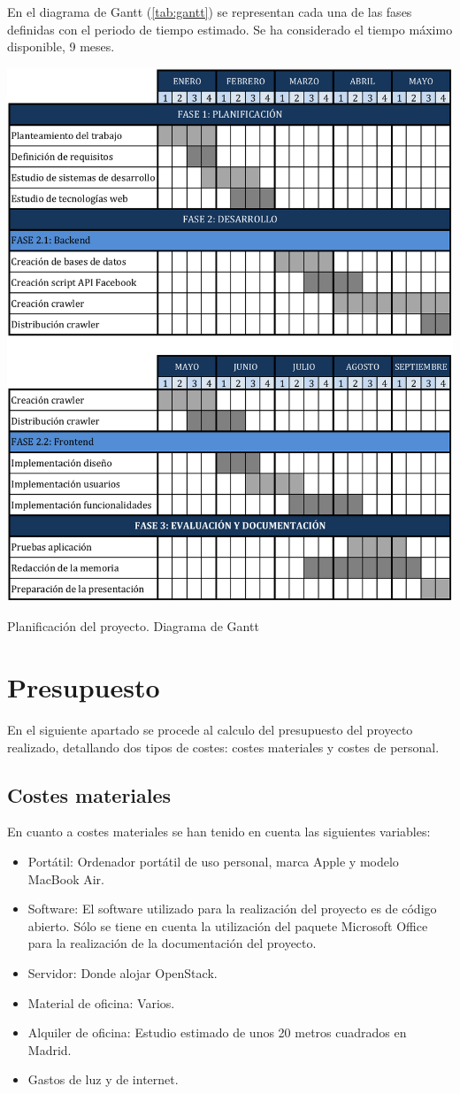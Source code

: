 En el diagrama de Gantt (\ref{tab:gantt}) se representan cada una de las fases definidas con el periodo de tiempo estimado. Se ha considerado el tiempo máximo disponible, 9 meses.
\begin{table}[H]
	\centering
	\includegraphics[width=6in]{PDF/DiagramadeGantt.pdf}
	\caption{Planificación del proyecto. Diagrama de Gantt}
	\label{tab:gantt}
\end{table}

\section{Presupuesto}
En el siguiente apartado se procede al calculo del presupuesto del proyecto realizado, detallando dos tipos de costes: costes materiales y costes de personal.
\subsection{Costes materiales}
En cuanto a costes materiales se han tenido en cuenta las siguientes variables:
\begin{itemize}
\item Portátil: Ordenador portátil de uso personal, marca Apple y modelo MacBook Air.
\item Software: El software utilizado para la realización del proyecto es de código abierto. Sólo se tiene en cuenta la utilización del paquete Microsoft Office para la realización de la documentación del proyecto. 
\item Servidor: Donde alojar OpenStack.
\item Material de oficina: Varios.
\item Alquiler de oficina: Estudio estimado de unos 20 metros cuadrados en Madrid. 
\item Gastos de luz y de internet.
\end{itemize}
